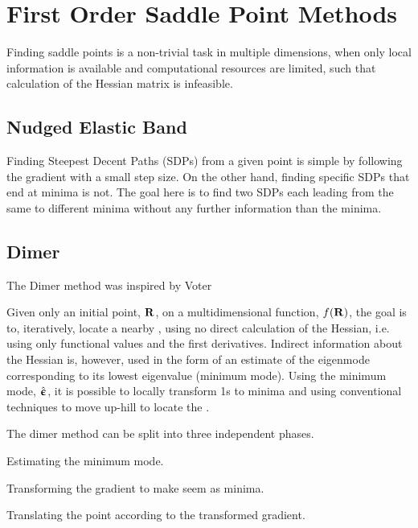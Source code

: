 \section{First Order Saddle Point Methods}
\label{sec:sps}

Finding saddle points is a non-trivial task in multiple dimensions, when only local information is available and computational resources are limited, such that calculation of the Hessian matrix is infeasible.

\incomplete

\subsection{Nudged Elastic Band}
\label{sec:neb}

Finding Steepest Decent Paths (SDPs) from a given point is simple by following the gradient with a small step size.
On the other hand, finding specific SDPs that end at minima is not.
The goal here is to find two SDPs each leading from the same  to different minima without any further information than the minima.


\incomplete

\subsection{Dimer}
\label{sec:dimer}

The Dimer method was inspired by Voter\cite{voter-hyperdynamics-1997}

Given only an initial point, ${\mathrm{\mathbf{\bm{R}}}}$, on a multidimensional function, $f({\mathrm{\mathbf{\bm{R}}}})$, the goal is to, iteratively, locate a nearby , using no direct calculation of the Hessian, i.e. using only functional values and the first derivatives.
Indirect information about the Hessian is, however, used in the form of an estimate of the eigenmode corresponding to its lowest eigenvalue (minimum mode).
Using the minimum mode, $\hat{{\mathrm{\mathbf{\bm{\upepsilon}}}}}$, it is possible to locally transform \sap1s to minima and using conventional techniques to move up-hill to locate the .

The dimer method can be split into three independent phases.
\item Estimating the minimum mode.
\item Transforming the gradient to make  seem as minima.
\item Translating the point according to the transformed gradient.
\een

